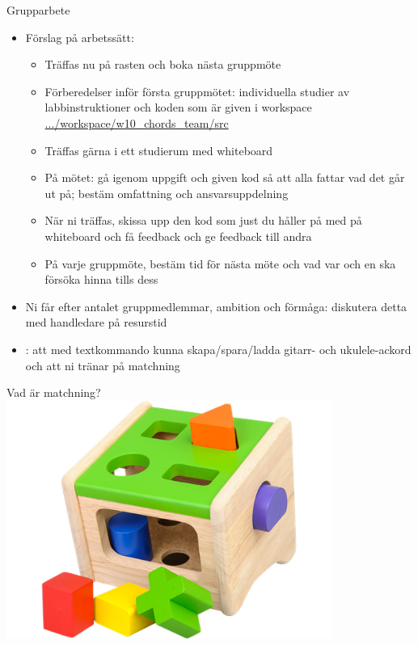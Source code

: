 \begin{Slide}{Grupparbete}\SlideFontSmall
\begin{itemize}
\item Förslag på arbetssätt:
\begin{itemize}\SlideFontSmall
\item Träffas nu på rasten och boka nästa gruppmöte
\item Förberedelser inför första gruppmötet: individuella studier av labbinstruktioner och koden som är given i workspace \\
\href{https://github.com/lunduniversity/introprog/tree/master/workspace/w10_chords_team/src}{.../workspace/w10\_chords\_team/src} \\
\item Träffas gärna i ett studierum med whiteboard
\item På mötet: gå igenom uppgift och given kod så att alla fattar vad det går ut på; bestäm omfattning och ansvarsuppdelning
\item När ni träffas, skissa upp den kod som just du håller på med på whiteboard och få feedback och ge feedback till andra
\item På varje gruppmöte, bestäm tid för nästa möte och vad var och en ska försöka hinna tills dess
\end{itemize}


\item Ni får  efter antalet gruppmedlemmar, ambition och förmåga: diskutera detta med handledare på resurstid

\item {}: att med textkommando kunna skapa/spara/ladda gitarr- och ukulele-ackord och att ni tränar på matchning

\end{itemize}
\end{Slide}



\begin{Slide}{Vad är matchning?}
\includegraphics[width=0.8\textwidth]{../img/plocklada.png}
\end{Slide}


